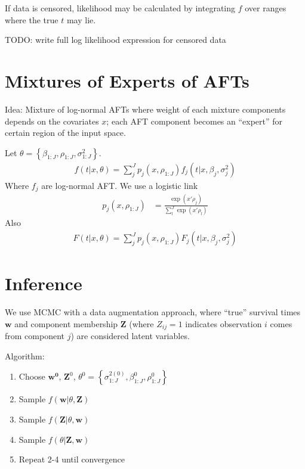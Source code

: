 \documentclass[11pt,letterpaper]{article}
\begin{document}
If data is censored, likelihood may be calculated by integrating $f$ over ranges where the true $t$ may lie.

TODO: write full log likelihood expression for censored data

\section{Mixtures of Experts of AFTs}

Idea: Mixture of log-normal AFTs where weight of each mixture components depends on
the covariates $x$; each AFT component becomes an ``expert'' for certain region of the input space.

Let $\theta = \left\{ \beta_{1:J}, \rho_{1:J}, \sigma^2_{1:J} \right\}$.
\begin{align*}
    f(t|x, \theta) = \sum_{j}^J p_j(x, \rho_{1:J}) f_j(t|x, \beta_j, \sigma^2_j)
\end{align*}
Where $f_j$ are log-normal AFT. We use a logistic link
\begin{align*}
    p_j(x, \rho_{1:J}) &= \frac{\exp(x'\rho_j)}{\sum_l^J \exp(x'\rho_l)}
\end{align*}
Also
\begin{align*}
    F(t|x, \theta) = \sum_{j}^J p_j(x, \rho_{1:J}) F_j(t|x, \beta_j, \sigma^2_j)
\end{align*}

\section{Inference}

We use MCMC with a data augmentation approach, where ``true'' survival times $
\mathbf{w}$ and component membership $\mathbf{Z}$ (where $Z_{ij}=1$ indicates
observation $i$ comes from component $j$) are considered latent variables.

Algorithm: 
\begin{enumerate}
    \item Choose $\mathbf{w^0}$, $\mathbf{Z}^0$, $\theta^0 = \left\{ \sigma^{2(0)}_{1:J}, \beta_{1:J}^0, \rho_{1:J}^0 \right\}$ 
    \item Sample $f( \mathbf{w} | \theta, \mathbf{Z} )$ 
    \item Sample $f( \mathbf{Z} | \theta, \mathbf{w} )$
    \item Sample $f( \theta | \mathbf{Z}, \mathbf{w})$
    \item Repeat 2-4 until convergence
\end{enumerate}
\end{document}
